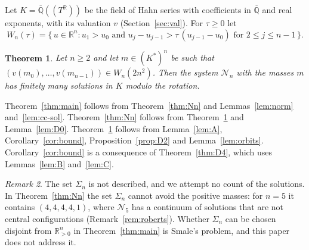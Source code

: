 \documentclass[11pt]{amsart}
\newtheorem{theorem}{Theorem}[section]
\theoremstyle{definition}
\theoremstyle{remark}
\newtheorem{remark}[theorem]{Remark}
\numberwithin{equation}{section}
\newcommand{\Qbar}{\overline{\mathbb{Q}}}
\newcommand{\RR}{\mathbb{R}}
\newcommand{\cN}{\mathcal{N}}
\begin{document}
Let $K = \Qbar((T^{\RR}))$ be the field of Hahn series with coefficients in $\Qbar$ and real exponents,
with its valuation $v$ (Section~\ref{sec:val}). For $\tau \ge 0$ let
\begin{equation}\label{eq:chamber}
  W_n(\tau) = \bigl\{\, u \in \RR^n : u_1 > u_0 \text{ and } u_j - u_{j-1} > \tau\,(u_{j-1} - u_0)
  \text{ for } 2 \le j \le n-1 \,\bigr\}.
\end{equation}

\begin{theorem}\label{thm:K}
Let $n \ge 2$ and let $m \in (K^{*})^n$ be such that $(v(m_0), \dots, v(m_{n-1})) \in W_n(2n^2)$. Then the
system $\cN_n$ with the masses $m$ has finitely many solutions in $K$ modulo the rotation.
\end{theorem}

Theorem~\ref{thm:main} follows from Theorem~\ref{thm:Nn} and Lemmas~\ref{lem:norm}
and~\ref{lem:cc-sol}. Theorem~\ref{thm:Nn} follows from Theorem~\ref{thm:K} and
Lemma~\ref{lem:D0}. Theorem~\ref{thm:K} follows from Lemma~\ref{lem:A}, Corollary~\ref{cor:bound},
Proposition~\ref{prop:D2} and Lemma~\ref{lem:orbits}. Corollary~\ref{cor:bound} is a consequence of
Theorem~\ref{thm:D4}, which uses Lemmas~\ref{lem:B} and~\ref{lem:C}.

\begin{remark}\label{rem:scope}
The set $\Sigma_n$ is not described, and we attempt no count of the solutions. In
Theorem~\ref{thm:Nn} the set $\Sigma_n$ cannot avoid the positive masses: for $n = 5$ it contains
$(4, 4, 4, 4, 1)$, where $\cN_5$ has a continuum of solutions that are not central configurations
(Remark~\ref{rem:roberts}). Whether $\Sigma_n$ can be chosen disjoint from $\RR_{>0}^n$ in
Theorem~\ref{thm:main} is Smale's problem, and this paper does not address it.
\end{remark}
\end{document}
